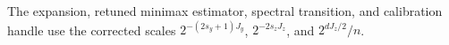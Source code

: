 The expansion, retuned minimax estimator, spectral transition, and calibration handle use the corrected scales \(2^{-(2s_y+1)J_y}\), \(2^{-2s_zJ_z}\), and \(2^{dJ_z/2}/n\).